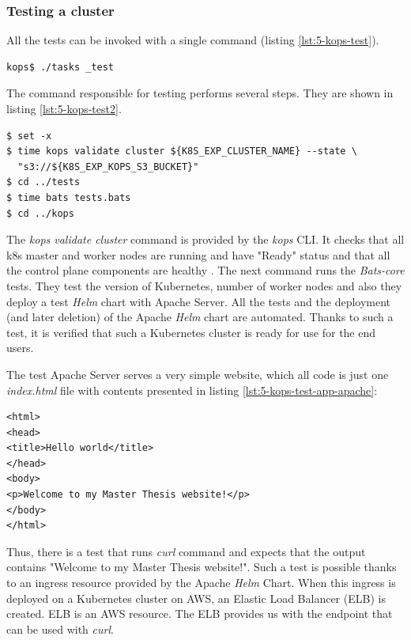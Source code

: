 \subsubsection{Testing a cluster}
\label{kops-testing}
All the tests can be invoked with a single command (listing \ref{lst:5-kops-test}).
\begin{lstlisting}[basicstyle=\scriptsize,xleftmargin=0cm,label=lst:5-kops-test,caption={Testing a \textit{kops} cluster}]
kops$ ./tasks _test
\end{lstlisting}

The command responsible for testing performs several steps. They are shown in listing \ref{lst:5-kops-test2}.
\begin{lstlisting}[basicstyle=\scriptsize,xleftmargin=0cm,label=lst:5-kops-test2,caption={Testing a \textit{kops} cluster - deeper dive}]
$ set -x
$ time kops validate cluster ${K8S_EXP_CLUSTER_NAME} --state \
  "s3://${K8S_EXP_KOPS_S3_BUCKET}"
$ cd ../tests
$ time bats tests.bats
$ cd ../kops
\end{lstlisting}

The \textit{kops validate cluster} command is provided by the \textit{kops} CLI. It checks that all k8s master and worker nodes are running and have "Ready" status and that all the control plane components are healthy \cite{online-kops-valid}. The next command runs the \textit{Bats-core} tests. They test the version of Kubernetes, number of worker nodes and also they deploy a test \textit{Helm} chart with Apache Server. All the tests and the deployment (and later deletion) of the Apache \textit{Helm} chart are automated.  Thanks to such a test, it is verified that such a Kubernetes cluster is ready for use for the end users.

The test Apache Server serves a very simple website, which all code is just one \textit{index.html} file with contents presented in listing \ref{lst:5-kops-test-app-apache}:
\begin{lstlisting}[basicstyle=\scriptsize,xleftmargin=0cm,label=lst:5-kops-test-app-apache,caption={Contents of a test application - Apache web server}]
<html>
<head>
<title>Hello world</title>
</head>
<body>
<p>Welcome to my Master Thesis website!</p>
</body>
</html>
\end{lstlisting}
Thus, there is a test that runs \textit{curl} command and expects that the output contains "Welcome to my Master Thesis website!". Such a test is possible thanks to an ingress resource provided by the Apache \textit{Helm} Chart. When this ingress is deployed on a Kubernetes cluster on AWS, an Elastic Load Balancer (ELB) is created. ELB is an AWS resource. The ELB provides us with the endpoint that can be used with \textit{curl}.


